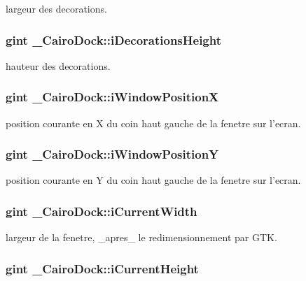 largeur des decorations. 

\subsubsection{\setlength{\rightskip}{0pt plus 5cm}gint {\bf \_\-CairoDock::iDecorationsHeight}}\label{struct__CairoDock_28faa8b5272d11886cebba27f04c9e1d}


hauteur des decorations. 

\subsubsection{\setlength{\rightskip}{0pt plus 5cm}gint {\bf \_\-CairoDock::iWindowPositionX}}\label{struct__CairoDock_350e80cc165ca7f9fbb38aad56f715eb}


position courante en X du coin haut gauche de la fenetre sur l'ecran. 

\subsubsection{\setlength{\rightskip}{0pt plus 5cm}gint {\bf \_\-CairoDock::iWindowPositionY}}\label{struct__CairoDock_183e9c6c7ac97503b4b31a020e807d1d}


position courante en Y du coin haut gauche de la fenetre sur l'ecran. 

\subsubsection{\setlength{\rightskip}{0pt plus 5cm}gint {\bf \_\-CairoDock::iCurrentWidth}}\label{struct__CairoDock_43e54fd882b5e767cc3e6f2b148c6f1e}


largeur de la fenetre, \_\-apres\_\- le redimensionnement par GTK. 

\subsubsection{\setlength{\rightskip}{0pt plus 5cm}gint {\bf \_\-CairoDock::iCurrentHeight}}\label{struct__CairoDock_768cd3d7e7d3755257b3c8f728436aae}


